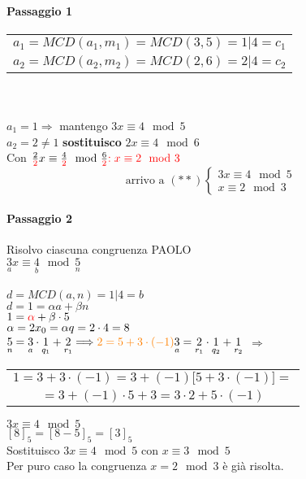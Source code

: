 \paragraph{Passaggio 1} 
\begin{tabular}{c}
    $a_1=MCD(a_1,m_1)=MCD(3,5)=1|4=c_1$\\
    $a_2=MCD(a_2,m_2)=MCD(2,6)=2|4=c_2$
\end{tabular}
\\
\\
$a_1=1\Longrightarrow $ mantengo $3x\equiv 4\mod 5$\\
$a_2=2\neq1 $ \textbf{sostituisco}  $2x\equiv 4\mod 6$\\
Con $\frac{2}{\color{red} 2}x\equiv \frac{4}{\color{red} 2} \mod \frac{6}{\color{red} 2}{\color{red} : x\equiv 2\mod 3}$
$$
\textrm{arrivo a }(**)
\begin{cases}
    3x\equiv 4\mod 5\\
    x\equiv 2\mod 3
\end{cases}
$$

\paragraph{Passaggio 2} Risolvo ciascuna congruenza {\color{purple} PAOLO}\\  %

$\underset{a}{3}x\equiv\underset{b}{4}\mod \underset{n}{5}$\\\\
$d=MCD(a,n)=1|4=b$\\
$d=1=\alpha a+\beta n $\\
$1={\color{red} \alpha}+\beta \cdot 5$\\
{\color{red} \scriptsize{$\alpha = 2\\ x_0=\alpha q=2\cdot 4 = 8 $ }}\\
{\color{blue}
    $
    \underset{n}{5}=\underset{a}{3}\cdot\underset{q_1}{1}+\underset{r_1}{2}\Longrightarrow {\color{orange} 2=5+3\cdot(-1)}\\
    \underset{a}{3}=\underset{r_1}{2}\cdot\underset{q_2}{1}+\underset{r_2}{1}\\
    $
} 
{\color{purple}
        $\Longrightarrow$
}
\begin{tabular}{c}
    {\color{purple} $1=3+3\cdot(-1) = 3+(-1)\big[5+3\cdot(-1)\big]=$}\\
    {\color{purple} $=3+(-1)\cdot 5 + 3=3 \cdot 2 + 5 \cdot (-1)$}
\end{tabular}
$3x\equiv 4\mod 5$\\
$[8]_5=[8-5]_5=[3]_5$\\
Sostituisco $3x\equiv 4\mod 5$ con $x\equiv 3\mod 5$\\
Per puro caso la congruenza $x=2\mod 3$ è già risolta. 

